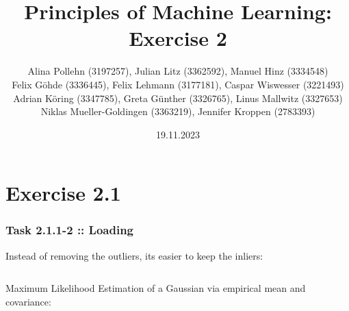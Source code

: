 \documentclass[10pt,aspectratio=169,handout]{beamer}
\begin{document}
\title{Principles of Machine Learning: Exercise 2}
\date{19.11.2023}
\author{Alina Pollehn (3197257), Julian Litz (3362592), Manuel Hinz (3334548)\\
    Felix Göhde (3336445), Felix Lehmann (3177181), Caspar Wiswesser (3221493)\\
    Adrian Köring (3347785), Greta Günther (3326765), Linus Mallwitz (3327653)\\
    Niklas Mueller-Goldingen (3363219), Jennifer Kroppen (2783393)}

\begin{frame}
    \maketitle
\end{frame}

\section{Exercise 2.1}
\begin{frame}
    \frametitle{Task 2.1.1-2 :: Loading}
    Instead of removing the outliers, its easier to keep the inliers:
    \inputminted[bgcolor=LightGray,fontsize=\small]{python}{code/filter-outliers.py}

    Maximum Likelihood Estimation of a Gaussian via empirical mean and covariance:
    \inputminted[bgcolor=LightGray,fontsize=\small]{python}{code/gaussian-mle.py}
\end{frame}
\end{document}
